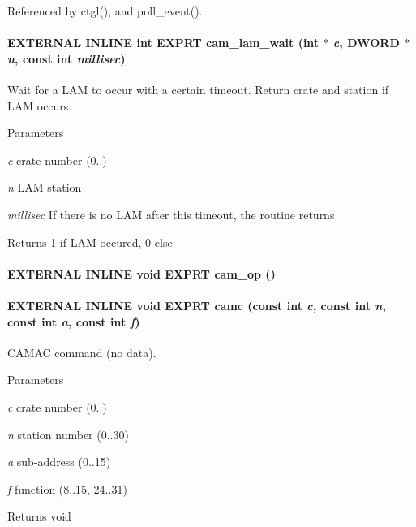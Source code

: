Referenced by ctgl(), and poll\_\-event().
\paragraph[{cam\_\-lam\_\-wait}]{\setlength{\rightskip}{0pt plus 5cm}EXTERNAL INLINE int EXPRT cam\_\-lam\_\-wait (int $\ast$ {\em c}, \/  {\bf DWORD} $\ast$ {\em n}, \/  const int {\em millisec})}\hfill\label{group__mcstdfunctionh_ga6ab62bed6c493eb48c45c31814a63e73}
Wait for a LAM to occur with a certain timeout. Return crate and station if LAM occurs. 
\begin{DoxyParams}{Parameters}
\item[{\em c}]crate number (0..) \item[{\em n}]LAM station \item[{\em millisec}]If there is no LAM after this timeout, the routine returns \end{DoxyParams}
\begin{DoxyReturn}{Returns}
1 if LAM occured, 0 else 
\end{DoxyReturn}
\paragraph[{cam\_\-op}]{\setlength{\rightskip}{0pt plus 5cm}EXTERNAL INLINE void EXPRT cam\_\-op ()}\hfill\label{group__mcstdfunctionh_ga4af5e699fd6eaeb5f336dc4092998a5b}
\paragraph[{camc}]{\setlength{\rightskip}{0pt plus 5cm}EXTERNAL INLINE void EXPRT camc (const int {\em c}, \/  const int {\em n}, \/  const int {\em a}, \/  const int {\em f})}\hfill\label{group__mcstdfunctionh_ga3840e8a0619db3b383cc2829b83b8e6a}
CAMAC command (no data). 
\begin{DoxyParams}{Parameters}
\item[{\em c}]crate number (0..) \item[{\em n}]station number (0..30) \item[{\em a}]sub-\/address (0..15) \item[{\em f}]function (8..15, 24..31) \end{DoxyParams}
\begin{DoxyReturn}{Returns}
void 
\end{DoxyReturn}


